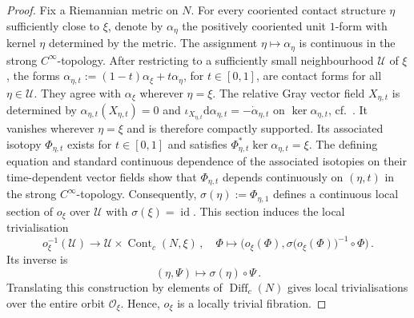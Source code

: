 \documentclass{amsart}
\theoremstyle{definition}
\newcommand{\rmd}{\mathrm d}
\newcommand{\OO}{\mathcal O}
\newcommand{\UU}{\mathcal U}
\newcommand{\lra}{\longrightarrow}
\DeclareMathOperator{\Diff}{\mathrm{Diff}}
\DeclareMathOperator{\id}{\mathrm{id}}
\begin{document}
\begin{proof}
Fix a Riemannian metric on $N$.
For every cooriented contact structure $\eta$
sufficiently close to $\xi$,
denote by $\alpha_{\eta}$
the positively cooriented unit $1$-form
with kernel $\eta$ determined by the metric.
The assignment $\eta\mapsto\alpha_{\eta}$
is continuous in the strong $C^\infty$-topology.
After restricting to a sufficiently small
neighbourhood $\UU$ of $\xi$,
the forms
$\alpha_{\eta,t}:=(1-t)\alpha_{\xi}+t\alpha_{\eta}$,
for $t\in[0,1]$,
are contact forms for all $\eta\in\UU$.
They agree with $\alpha_{\xi}$
wherever $\eta=\xi$.
The relative Gray vector field $X_{\eta,t}$
is determined by
$\alpha_{\eta,t}(X_{\eta,t})=0$ and
$\iota_{X_{\eta,t}}\rmd\alpha_{\eta,t}=-\dot\alpha_{\eta,t}$
on $\ker\alpha_{\eta,t}$,
cf.\ \cite[Theorem~2.2.2]{gei08}.
It vanishes wherever $\eta=\xi$
and is therefore compactly supported.
Its associated isotopy $\Phi_{\eta,t}$
exists for $t\in[0,1]$ and satisfies
$\Phi_{\eta,t}^*\ker\alpha_{\eta,t}=\xi$.
The defining equation and
standard continuous dependence
of the associated isotopies
on their time-dependent vector fields show that
$\Phi_{\eta,t}$ depends continuously on
$(\eta,t)$ in the strong $C^\infty$-topology.
Consequently, $\sigma(\eta):=\Phi_{\eta,1}$
defines a continuous local section of $o_{\xi}$
over $\UU$ with $\sigma(\xi)=\id$.
This section induces the local trivialisation
\[
o_{\xi}^{-1}(\UU)
\lra
\UU\times\operatorname{Cont}_c(N,\xi)
\,,
\quad
\Phi\longmapsto
\Big(
o_{\xi}(\Phi),
\sigma\big(o_{\xi}(\Phi)\big)^{-1}\circ\Phi
\Big)
\,.
\]
Its inverse is
\[
(\eta,\Psi)\longmapsto\sigma(\eta)\circ\Psi
\,.
\]
Translating this construction by elements of
$\Diff_c(N)$ gives local trivialisations
over the entire orbit $\OO_{\xi}$.
Hence, $o_{\xi}$ is a locally trivial fibration.
\end{proof}
\end{document}
